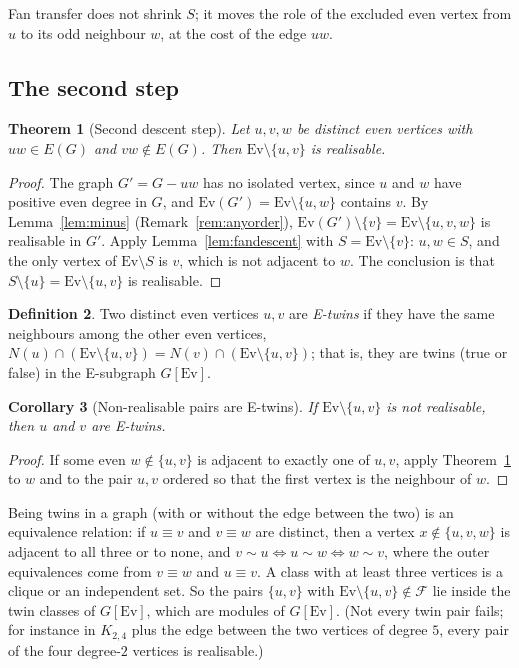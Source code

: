 \documentclass[11pt]{amsart}
\newtheorem{theorem}{Theorem}
\newtheorem{corollary}[theorem]{Corollary}
\theoremstyle{definition}
\newtheorem{definition}[theorem]{Definition}
\newcommand{\cF}{\mathcal F}
\newcommand{\Ev}{\mathrm{Ev}}
\begin{document}
Fan transfer does not shrink $S$; it moves the role of the excluded even vertex from $u$ to its odd
neighbour $w$, at the cost of the edge $uw$.

\subsection{The second step}

\begin{theorem}[Second descent step]\label{thm:second}
Let $u,v,w$ be distinct even vertices with $uw\in E(G)$ and $vw\notin E(G)$. Then
$\Ev\setminus\{u,v\}$ is realisable.
\end{theorem}

\begin{proof}
The graph $G'=G-uw$ has no isolated vertex, since $u$ and $w$ have positive even degree in $G$, and
$\Ev(G')=\Ev\setminus\{u,w\}$ contains $v$. By Lemma~\ref{lem:minus} (Remark~\ref{rem:anyorder}),
$\Ev(G')\setminus\{v\}=\Ev\setminus\{u,v,w\}$ is realisable in $G'$. Apply
Lemma~\ref{lem:fandescent} with $S=\Ev\setminus\{v\}$: $u,w\in S$, and the only vertex of
$\Ev\setminus S$ is $v$, which is not adjacent to $w$. The conclusion is that
$S\setminus\{u\}=\Ev\setminus\{u,v\}$ is realisable.
\end{proof}

\begin{definition}
Two distinct even vertices $u,v$ are \emph{E-twins} if they have the same neighbours among the
other even vertices, $N(u)\cap(\Ev\setminus\{u,v\})=N(v)\cap(\Ev\setminus\{u,v\})$; that is, they are
twins (true or false) in the E-subgraph $G[\Ev]$.
\end{definition}

\begin{corollary}[Non-realisable pairs are E-twins]\label{cor:twins}
If $\Ev\setminus\{u,v\}$ is not realisable, then $u$ and $v$ are E-twins.
\end{corollary}

\begin{proof}
If some even $w\notin\{u,v\}$ is adjacent to exactly one of $u,v$, apply Theorem~\ref{thm:second}
to $w$ and to the pair $u,v$ ordered so that the first vertex is the neighbour of $w$.
\end{proof}

Being twins in a graph (with or without the edge between the two) is an equivalence relation: if
$u\equiv v$ and $v\equiv w$ are distinct, then a vertex $x\notin\{u,v,w\}$ is adjacent to all three or
to none, and $v\sim u\Leftrightarrow u\sim w\Leftrightarrow w\sim v$, where the outer
equivalences come from $v\equiv w$ and $u\equiv v$. A class with at least three vertices is a
clique or an independent set. So the pairs $\{u,v\}$ with $\Ev\setminus\{u,v\}\notin\cF$ lie inside
the twin classes of $G[\Ev]$, which are modules of $G[\Ev]$. (Not every twin pair fails; for
instance in $K_{2,4}$ plus the edge between the two vertices of degree $5$, every pair of the four
degree-$2$ vertices is realisable.)
\end{document}
